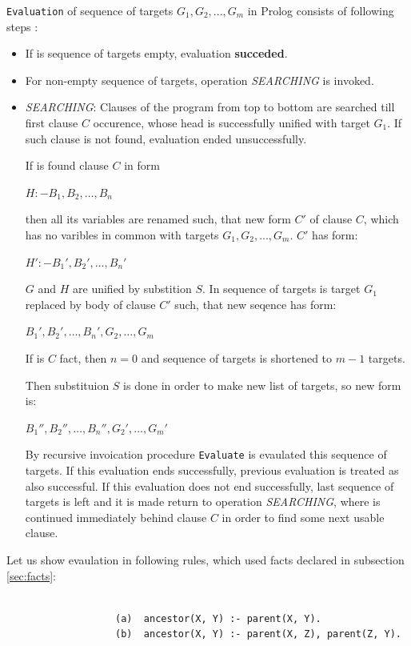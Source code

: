 \documentclass[11pt,twoside,a4paper]{book}
\begin{document}
\verb|Evaluation| of sequence of targets $G_1, G_2,..., G_m$ in Prolog consists
of following steps \cite{kolar:jui}:
\begin{itemize}
  \item If is sequence of targets empty, evaluation \textbf{succeded}.
  \item For non-empty sequence of targets, operation \textit{SEARCHING} is
  invoked.
  \item \textit{SEARCHING}: Clauses of the program from top to bottom are
  searched till first clause $C$ occurence, whose head is successfully
  unified with target $G_1$. If such clause is not found, evaluation ended
  unsuccessfully.
  
  If is found clause $C$ in form
 \begin{center}
                          $H :- B_1, B_2,\ldots, B_n$
\end{center}
then all its variables are renamed such, that new form $C'$ of clause $C$, which
has no varibles in common with targets $G_1, G_2,..., G_m$. $C'$ has form:
\begin{center}
                          $H' :- B_1', B_2',\ldots, B_n'$
\end{center}
$G$ and $H$ are unified by substition $S$.
In sequence of targets is target $G_1$ replaced by body of clause $C'$ such,
that new seqence has form:
\begin{center}
                          $B_1', B_2',\ldots, B_n', G_2,\ldots, G_m$
\end{center}
If is $C$ fact, then $n = 0$ and sequence of targets is shortened to $m - 1$
targets.

Then substituion $S$ is done in order to make new list of targets, so new form
is:
\begin{center}
                          $B_1'', B_2'',\ldots, B_n'', G_2',\ldots, G_m'$
\end{center}


By recursive invoication procedure \verb|Evaluate| is evaulated this sequence of
targets. If this evaluation ends successfully, previous evaluation is treated as
also successful. If this evaluation does not end successfully, last sequence of
targets is left and it is made return to operation \textit{SEARCHING}, where is
continued immediately behind clause $C$ in order to find some next usable
clause.
\end{itemize}
Let us show evaulation in following rules, which used facts declared in
subsection \ref{sec:facts}:\\
\\
\begin{verbatim}
                   (a)  ancestor(X, Y) :- parent(X, Y).
                   (b)  ancestor(X, Y) :- parent(X, Z), parent(Z, Y).
\end{verbatim}
\end{document}
